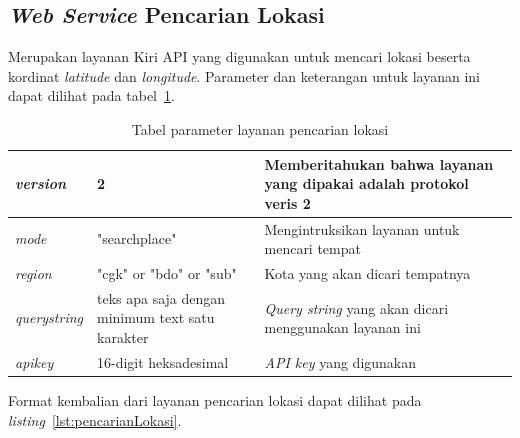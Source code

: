 \subsection{\textit{Web Service} Pencarian Lokasi}
\label{subsec:Pencarian Lokasi Service}
\hspace{0.5cm} Merupakan layanan Kiri API yang digunakan untuk mencari lokasi beserta kordinat \textit{latitude} dan \textit{longitude}. Parameter dan keterangan untuk layanan ini dapat dilihat pada tabel~\ref{tab:pencarianLokasi}.

\begin{table}[H]
	\centering
		\begin{tabular}{ |p{2cm}|p{4cm}|p{8cm}| }
			\hline
			\textit{version} & 2 & Memberitahukan bahwa layanan yang dipakai adalah protokol veris 2 \\ \hline
			\textit{mode} & "searchplace" & Mengintruksikan layanan untuk mencari tempat \\ \hline
			\textit{region} & "cgk" or "bdo" or "sub" & Kota yang akan dicari tempatnya \\ \hline
			\textit{querystring} & teks apa saja dengan minimum text satu karakter & \textit{Query string} yang akan dicari menggunakan  layanan ini \\ \hline
			\textit{apikey} & 16-digit heksadesimal & \textit{API key} yang digunakan \\ \hline
			\hline
		\end{tabular}
	\caption{Tabel parameter layanan pencarian lokasi}
	\label{tab:pencarianLokasi}
\end{table}

\vspace{5mm}
Format kembalian dari layanan pencarian lokasi dapat dilihat pada \textit{listing}~\ref{lst:pencarianLokasi}.

